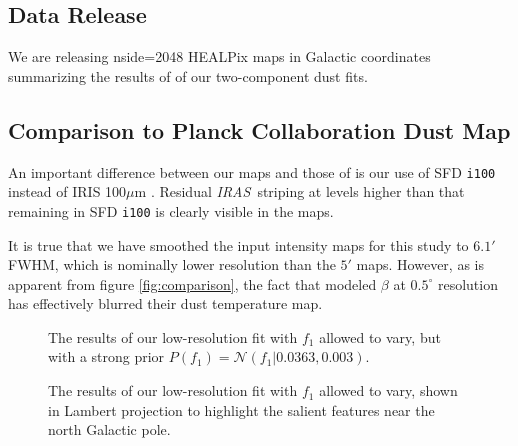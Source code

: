 \documentclass{emulateapj}
\newcommand{\IRAS}{{\it IRAS}}
\begin{document}


\subsection{Data Release}
We are releasing nside=2048 HEALPix maps in Galactic coordinates summarizing 
the results of of our two-component dust fits.



\subsection{Comparison to Planck Collaboration Dust Map}
An important difference between our maps and those of \cite{planckdust} is our 
use of SFD \verb|i100| instead of IRIS 100$\mu$m \citep{IRIS}. Residual 
\IRAS~striping at levels higher than that remaining in SFD \verb|i100| is 
clearly visible in the \cite{planckdust} maps.

It is true that we have smoothed the input intensity maps for this study 
to $6.1'$ FWHM, which is nominally lower resolution than the $5'$ 
\cite{planckdust} maps. However, as is apparent from figure 
\ref{fig:comparison}, the fact that \cite{planckdust} modeled $\beta$ at 
$0.5^{\circ}$ resolution has effectively blurred their dust temperature map.

\begin{figure}
\begin{center}
\caption{\label{fig:f1} The results of our low-resolution fit with $f_1$
allowed to vary, but with a strong prior 
$P(f_1)=\mathcal{N}(f_1|0.0363, 0.003)$.}
\end{center}
\end{figure}

\begin{figure}
\begin{center}
\caption{\label{fig:f1lambert} The results of our low-resolution fit with $f_1$
allowed to vary, shown in Lambert projection to highlight the salient features 
near the north Galactic pole.}
\end{center}
\end{figure}
\end{document}
